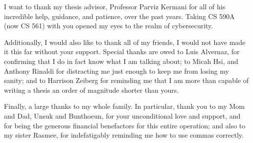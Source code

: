 I want to thank my thesis advisor, Professor Parviz Kermani for all of his incredible help, guidance, and patience, over the past years. %
Taking CS 590A (now CS 561) with you opened my eyes to the realm of cybersecurity.

Additionally, I would also like to thank all of my friends, I would not have made it this far without your support. %
Special thanks are owed to Luis Alvernaz, for confirming that I do in fact know what I am talking about; %
to Micah Hsi, and Anthony Rinaldi for distracting me just enough to keep me from losing my sanity; %
and to Harrison Zeiberg for reminding me that I am more than capable of writing a thesis an order of magnitude shorter than yours. 

Finally, a large thanks to my whole family. %
In particular, thank you to my Mom and Dad, Unsuk and Bunthoeun, for your unconditional love and support, and for being the generous financial benefactors for this entire operation; %
and also to my sister Rasmee, for indefatigably reminding me how to use commas correctly.